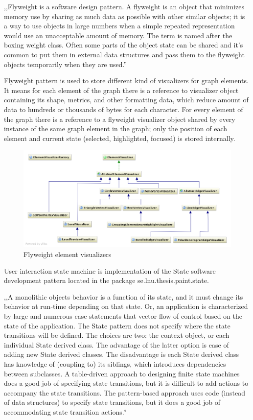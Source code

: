 ,,Flyweight is a software design pattern. A flyweight is an object that minimizes memory use by sharing as much data as possible with other similar objects; it is a way to use objects in large numbers when a simple repeated representation would use an unacceptable amount of memory. The term is named after the boxing weight class. Often some parts of the object state can be shared and it's common to put them in external data structures and pass them to the flyweight objects temporarily when they are used.''~\cite{FLYWEIGHT}

Flyweight pattern is used to store different kind of visualizers for graph elements. It means for each element of the graph there is a reference to visualizer object containing its shape, metrics, and other formatting data, which reduce amount of data to hundreds or thousands of bytes for each character. For every element of the graph there is a reference to a flyweight visualizer object shared by every instance of the same graph element in the graph; only the position of each element and current state (selected, highlighted, focused) is stored internally.

\begin{figure}[h!]
\centering
\includegraphics[scale=0.35]{pictures/uml_visualizers.png}
\caption{Flyweight element visualizers}
\label{fig:uml_visualizers}
\end{figure}

User interaction state machine is implementation of the State software development pattern located in the package \textsf{se.lnu.thesis.paint.state}. 

,,A monolithic objects behavior is a function of its state, and it must change its behavior at run-time depending on that state. Or, an application is characterized by large and numerous case statements that vector flow of control based on the state of the application. The State pattern does not specify where the state transitions will be defined. The choices are two: the context object, or each individual State derived class. The advantage of the latter option is ease of adding new State derived classes. The disadvantage is each State derived class has knowledge of (coupling to) its siblings, which introduces dependencies between subclasses. A table-driven approach to designing finite state machines does a good job of specifying state transitions, but it is difficult to add actions to accompany the state transitions. The pattern-based approach uses code (instead of data structures) to specify state transitions, but it does a good job of accommodating state transition actions.''~\cite{STATE}


